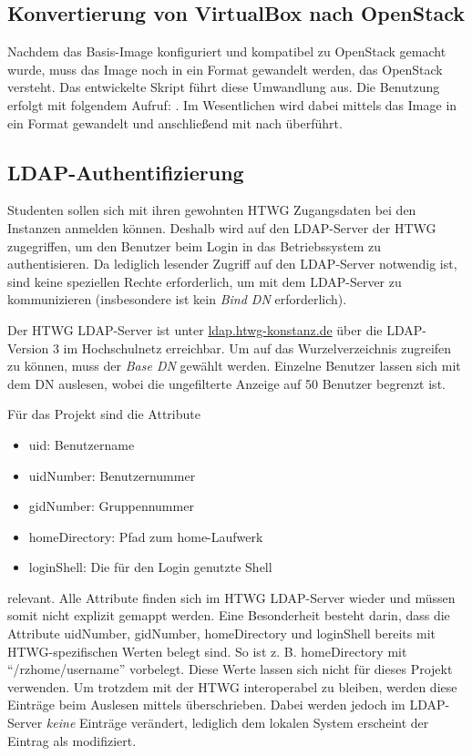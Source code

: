 \subsection{Konvertierung von VirtualBox nach OpenStack}

Nachdem das Basis-Image konfiguriert und kompatibel zu OpenStack gemacht wurde, muss das Image noch in ein Format gewandelt werden, das OpenStack versteht.
Das entwickelte Skript  führt diese Umwandlung aus. 
Die Benutzung erfolgt mit folgendem Aufruf: .
Im Wesentlichen wird dabei mittels  das Image in ein  Format gewandelt und anschließend mit  nach  überführt.

\subsection{LDAP-Authentifizierung}\label{ldap_auth2}

Studenten sollen sich mit ihren gewohnten HTWG Zugangsdaten bei den Instanzen anmelden können. 
Deshalb wird auf den LDAP-Server der HTWG zugegriffen, um den Benutzer beim Login in das Betriebssystem zu authentisieren. 
Da lediglich lesender Zugriff auf den LDAP-Server notwendig ist, sind keine speziellen Rechte erforderlich, um  mit dem LDAP-Server zu kommunizieren (insbesondere ist kein \emph{Bind DN} erforderlich).

Der HTWG LDAP-Server ist unter \url{ldap.htwg-konstanz.de} über die LDAP-Version 3 im Hochschulnetz erreichbar. 
Um auf das Wurzelverzeichnis zugreifen zu können, muss der \emph{Base DN}  gewählt werden. 
Einzelne Benutzer lassen sich mit dem DN  auslesen, wobei die ungefilterte Anzeige auf 50 Benutzer begrenzt ist. 

Für das Projekt sind die Attribute

\begin{itemize}
\item uid: Benutzername
\item uidNumber: Benutzernummer
\item gidNumber: Gruppennummer
\item homeDirectory: Pfad zum home-Laufwerk
\item loginShell: Die für den Login genutzte Shell
\end{itemize}

relevant. Alle Attribute finden sich im HTWG LDAP-Server wieder und müssen somit nicht explizit gemappt werden. 
Eine Besonderheit besteht darin, dass die Attribute uidNumber, gidNumber, homeDirectory und loginShell bereits mit HTWG-spezifischen Werten belegt sind. 
So ist z. B. homeDirectory mit \enquote{/rzhome/username} vorbelegt.
Diese Werte lassen sich nicht für dieses Projekt verwenden.
Um trotzdem mit der HTWG interoperabel zu bleiben, werden diese Einträge beim Auslesen mittels  überschrieben. 
Dabei werden jedoch im LDAP-Server \emph{keine} Einträge verändert, lediglich dem lokalen System erscheint der Eintrag als modifiziert.

